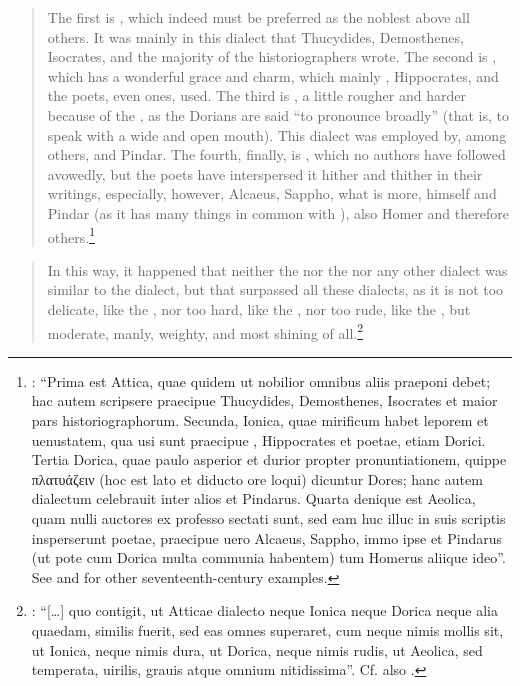 \begin{quote}
The first is , which indeed must be preferred as the noblest above all others. It was mainly in this dialect that Thucydides, Demosthenes, Isocrates, and the majority of the historiographers wrote. The second is , which has a wonderful grace and charm, which mainly , Hippocrates, and the poets, even  ones, used. The third is , a little rougher and harder because of the , as the Dorians are said “to pronounce broadly” (that is, to speak with a wide and open mouth). This dialect was employed by, among others,  and Pindar. The fourth, finally, is , which no authors have followed avowedly, but the poets have interspersed it hither and thither in their writings, especially, however, Alcaeus, Sappho, what is more,  himself and Pindar (as it has many things in common with ), also Homer and therefore others.\footnote{\citet[2--3]{Merigon1621}: “Prima est Attica, quae quidem ut nobilior omnibus aliis praeponi debet; hac autem scripsere praecipue Thucydides, Demosthenes, Isocrates et maior pars historiographorum. Secunda, Ionica, quae mirificum habet leporem et uenustatem, qua usi sunt praecipue , Hippocrates et poetae, etiam Dorici. Tertia Dorica, quae paulo asperior et durior propter pronuntiationem, quippe πλατυάζειν (hoc est lato et diducto ore loqui) dicuntur Dores; hanc autem dialectum celebrauit inter alios  et Pindarus. Quarta denique est Aeolica, quam nulli auctores ex professo sectati sunt, sed eam huc illuc in suis scriptis insperserunt poetae, praecipue uero Alcaeus, Sappho, immo  ipse et Pindarus (ut pote cum Dorica multa communia habentem) tum Homerus aliique ideo”. See \citet{Hoius1620} and \citet{Rhenius1626} for other seventeenth-century examples.}
\end{quote}

\begin{quote}
In this way, it happened that neither the  nor the  nor any other dialect was similar to the  dialect, but that  surpassed all these dialects, as it is not too delicate, like the , nor too hard, like the , nor too rude, like the , but moderate, manly, weighty, and most shining of all.\footnote{\citet[6]{Georgi1729}: “[…] quo contigit, ut Atticae dialecto neque Ionica neque Dorica neque alia quaedam, similis fuerit, sed eas omnes superaret, cum neque nimis mollis sit, ut Ionica, neque nimis dura, ut Dorica, neque nimis rudis, ut Aeolica, sed temperata, uirilis, grauis atque omnium nitidissima”. Cf. also \citet[197--199]{Ries1786}.}
\end{quote}

